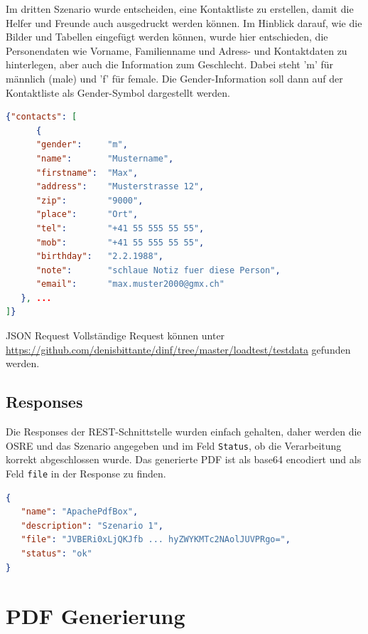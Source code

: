 \documentclass[main.tex]{subfiles}
\begin{document}
Im dritten Szenario wurde entscheiden, eine Kontaktliste zu erstellen, damit die Helfer und Freunde auch ausgedruckt werden können. Im Hinblick darauf, wie die Bilder und Tabellen eingefügt werden können, wurde hier entschieden, die Personendaten wie Vorname, Familienname und Adress- und Kontaktdaten zu hinterlegen, aber auch die Information zum Geschlecht. Dabei steht ’m’ für männlich (male) und ’f’ für female. Die Gender-Information soll dann auf der Kontaktliste als Gender-Symbol dargestellt werden.

\begin{lstlisting}[language=json]
{"contacts": [
      {
      "gender":     "m",
      "name":       "Mustername",
      "firstname":  "Max",
      "address":    "Musterstrasse 12",
      "zip":        "9000",
      "place":      "Ort",
      "tel":        "+41 55 555 55 55",
      "mob":        "+41 55 555 55 55",
      "birthday":   "2.2.1988",
      "note":       "schlaue Notiz fuer diese Person",
      "email":      "max.muster2000@gmx.ch"
   }, ...
]}


\end{lstlisting}

\begin{reference}{JSON Request}
 Vollständige Request können unter \url{https://github.com/denisbittante/dinf/tree/master/loadtest/testdata} gefunden werden.
\end{reference}
 


\subsection{Responses}
Die Responses der REST-Schnittstelle wurden einfach gehalten, daher werden die OSRE und das Szenario angegeben und im Feld \texttt{Status}, ob die Verarbeitung korrekt abgeschlossen wurde. Das generierte PDF ist als base64 encodiert und als Feld \texttt{file} in der Response zu finden. 
\begin{lstlisting}[language=json]
{
   "name": "ApachePdfBox",
   "description": "Szenario 1",
   "file": "JVBERi0xLjQKJfb ... hyZWYKMTc2NAolJUVPRgo=",
   "status": "ok"
}

\end{lstlisting}




\section{PDF Generierung}
\end{document}
